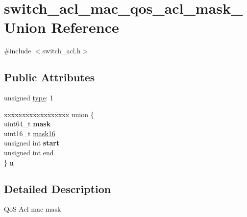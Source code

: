 \hypertarget{unionswitch__acl__mac__qos__acl__mask__}{\section{switch\+\_\+acl\+\_\+mac\+\_\+qos\+\_\+acl\+\_\+mask\+\_\+ Union Reference}
\label{unionswitch__acl__mac__qos__acl__mask__}
}


{\ttfamily \#include $<$switch\+\_\+acl.\+h$>$}

\subsection*{Public Attributes}
\begin{DoxyCompactItemize}
\item 
unsigned \hyperlink{unionswitch__acl__mac__qos__acl__mask___aaac08b207b271d9b28aace0f71b4cadc}{type}\+: 1
\item 
\begin{tabbing}
xx\=xx\=xx\=xx\=xx\=xx\=xx\=xx\=xx\=\kill
union \{\\
\>uint64\_t {\bfseries mask}\\
\>uint16\_t \hyperlink{unionswitch__acl__mac__qos__acl__mask___a48560a5cc896e229da8c9ffb9672019f}{mask16}\\
\>unsigned int {\bfseries start}\\
\>unsigned int \hyperlink{unionswitch__acl__mac__qos__acl__mask___a66fac46784376e433a46541c316019e6}{end}\\
\} \hyperlink{unionswitch__acl__mac__qos__acl__mask___a13d5734593a3996cb9d5c0faeee46f9d}{u}\\

\end{tabbing}\end{DoxyCompactItemize}


\subsection{Detailed Description}
Qo\+S Acl mac mask 

